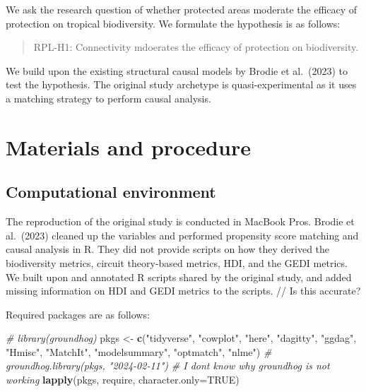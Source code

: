 \documentclass[
]{article}
\newenvironment{Shaded}{\begin{snugshade}}{\end{snugshade}}
\newcommand{\AttributeTok}[1]{\textcolor[rgb]{0.13,0.29,0.53}{#1}}
\newcommand{\CommentTok}[1]{\textcolor[rgb]{0.56,0.35,0.01}{\textit{#1}}}
\newcommand{\ConstantTok}[1]{\textcolor[rgb]{0.56,0.35,0.01}{#1}}
\newcommand{\FunctionTok}[1]{\textcolor[rgb]{0.13,0.29,0.53}{\textbf{#1}}}
\newcommand{\NormalTok}[1]{#1}
\newcommand{\OtherTok}[1]{\textcolor[rgb]{0.56,0.35,0.01}{#1}}
\newcommand{\StringTok}[1]{\textcolor[rgb]{0.31,0.60,0.02}{#1}}
\begin{document}
We ask the research question of whether protected areas moderate the
efficacy of protection on tropical biodiversity. We formulate the
hypothesis is as follows:

\begin{quote}
RPL-H1: Connectivity mdoerates the efficacy of protection on
biodiversity.
\end{quote}

We build upon the existing structural causal models by Brodie et
al.~(2023) to test the hypothesis. The original study archetype is
quasi-experimental as it uses a matching strategy to perform causal
analysis.

\hypertarget{materials-and-procedure}{%
\section{Materials and procedure}\label{materials-and-procedure}}

\hypertarget{computational-environment}{%
\subsection{Computational environment}\label{computational-environment}}

The reproduction of the original study is conducted in MacBook Pros.
Brodie et al.~(2023) cleaned up the variables and performed propensity
score matching and causal analysis in R. They did not provide scripts on
how they derived the biodiversity metrics, circuit theory-based metrics,
HDI, and the GEDI metrics. We built upon and annotated R scripts shared
by the original study, and added missing information on HDI and GEDI
metrics to the scripts. // Is this accurate?

Required packages are as follows:

\begin{Shaded}
\begin{Highlighting}[]
\CommentTok{\# library(groundhog)}
\NormalTok{pkgs }\OtherTok{\textless{}{-}} \FunctionTok{c}\NormalTok{(}\StringTok{"tidyverse"}\NormalTok{, }\StringTok{"cowplot"}\NormalTok{, }\StringTok{"here"}\NormalTok{, }\StringTok{"dagitty"}\NormalTok{, }\StringTok{"ggdag"}\NormalTok{, }\StringTok{"Hmisc"}\NormalTok{, }
          \StringTok{"MatchIt"}\NormalTok{, }\StringTok{"modelsummary"}\NormalTok{, }\StringTok{"optmatch"}\NormalTok{, }\StringTok{"nlme"}\NormalTok{)}
\CommentTok{\# groundhog.library(pkgs, "2024{-}02{-}11")}
\CommentTok{\# I don\textquotesingle{}t know why groundhog is not working}
\FunctionTok{lapply}\NormalTok{(pkgs, require, }\AttributeTok{character.only=}\ConstantTok{TRUE}\NormalTok{)}
\end{Highlighting}
\end{Shaded}
\end{document}
